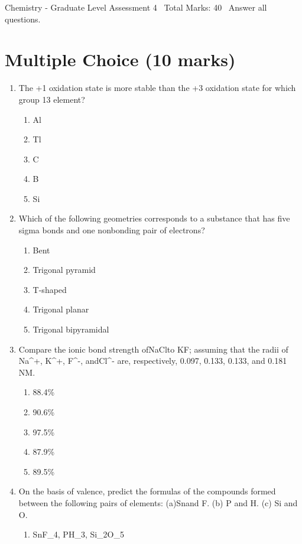 \documentclass[12pt]{article}
\begin{document}
\begin{center}
Chemistry - Graduate Level Assessment 4 \
Total Marks: 40 \
Answer all questions.
\end{center}

\section*{Multiple Choice (10 marks)}
\begin{enumerate}[label=\arabic*.]
\item The +1 oxidation state is more stable than the +3 oxidation state for which group 13
element?
\begin{enumerate}[label=(\alph*)]
    \item Al
    \item Tl
    \item C
    \item B
    \item Si
\end{enumerate}
\item Which of the following geometries corresponds to a substance that has five sigma bonds and
one nonbonding pair of electrons?
\begin{enumerate}[label=(\alph*)]
    \item Bent
    \item Trigonal pyramid
    \item T-shaped
    \item Trigonal planar
    \item Trigonal bipyramidal
\end{enumerate}
\item Compare the ionic bond strength ofNaClto KF; assuming that the radii of Na\^{}+, K\^{}+, F\^{}-,
andCl\^{}- are, respectively, 0.097, 0.133, 0.133, and 0.181 NM.
\begin{enumerate}[label=(\alph*)]
    \item 88.4\%
    \item 90.6\%
    \item 97.5\%
    \item 87.9\%
    \item 89.5\%
\end{enumerate}
\item On the basis of valence, predict the formulas of the compounds formed between the
following pairs of elements: (a)Snand F. (b) P and H. (c) Si and O.
\begin{enumerate}[label=(\alph*)]
    \item SnF\_4, PH\_3, Si\_2O\_5

\end{enumerate}
\end{enumerate}
\end{document}
